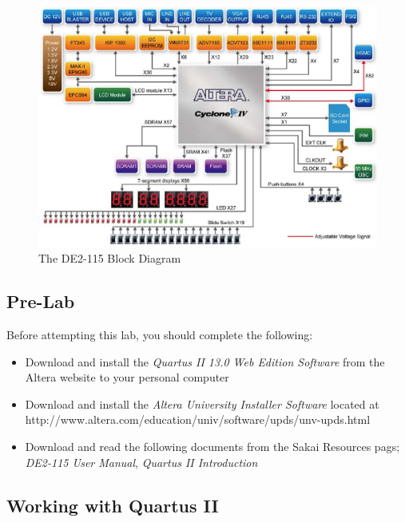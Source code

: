 \begin{figure}[H]
	\centering
	\includegraphics[width=170mm]{Lab1/figures/DE2-115Block.png}
	\caption{The DE2-115 Block Diagram}
	\label{fig:DE2Block}
\end{figure}

\subsection{Pre-Lab}

Before attempting this lab, you should complete the following:

\begin{itemize}
	\item Download and install the \emph{Quartus II 13.0 Web Edition Software} from the Altera website to your personal computer
	\item Download and install the \emph{Altera University Installer Software} located at http://www.altera.com/education/univ/software/upds/unv-upds.html
	\item Download and read the following documents from the Sakai Resources pags;  \emph{DE2-115 User Manual}, \emph{Quartus II Introduction}
\end{itemize}
 
\subsection{Working with Quartus II}

